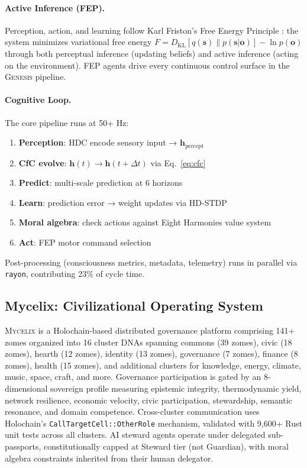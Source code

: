 \documentclass[11pt,letterpaper]{article}
\newcommand{\hv}{\mathbf{h}}
\newcommand{\mycelix}{\textsc{Mycelix}}
\newcommand{\genesis}{\textsc{Genesis}}
\begin{document}
\paragraph{Active Inference (FEP).} Perception, action, and learning follow Karl
Friston's Free Energy Principle \cite{friston2010free,friston2017active}: the
system minimizes variational free energy $F = D_\text{KL}[q(\mathbf{s}) \|
p(\mathbf{s} | \mathbf{o})] - \ln p(\mathbf{o})$ through both perceptual
inference (updating beliefs) and active inference (acting on the environment).
FEP agents drive every continuous control surface in the \genesis{} pipeline.

\paragraph{Cognitive Loop.} The core pipeline runs at 50+ Hz:
\begin{enumerate}[leftmargin=2em,nosep]
\item \textbf{Perception}: HDC encode sensory input → $\hv_\text{percept}$
\item \textbf{CfC evolve}: $\hv(t) \rightarrow \hv(t + \Delta t)$ via Eq.~\ref{eq:cfc}
\item \textbf{Predict}: multi-scale prediction at 6 horizons
\item \textbf{Learn}: prediction error → weight updates via HD-STDP
\item \textbf{Moral algebra}: check actions against Eight Harmonies value system
\item \textbf{Act}: FEP motor command selection
\end{enumerate}
Post-processing (consciousness metrics, metadata, telemetry) runs in parallel
via \texttt{rayon}, contributing 23\% of cycle time.

\subsection{Mycelix: Civilizational Operating System}

\mycelix{} is a Holochain-based distributed governance platform comprising 141+
zomes organized into 16 cluster DNAs spanning commons (39 zomes), civic (18 zomes), hearth (12 zomes), identity (13 zomes), governance (7 zomes), finance (8 zomes), health (15 zomes), and additional clusters for knowledge, energy, climate, music, space, craft, and more. Governance participation is gated by an 8-dimensional sovereign profile measuring epistemic integrity, thermodynamic yield, network resilience, economic velocity, civic participation, stewardship, semantic resonance, and domain competence. Cross-cluster
communication uses Holochain's \texttt{CallTargetCell::OtherRole} mechanism,
validated with 9,600+ Rust unit tests across all clusters. AI steward agents operate under delegated sub-passports, constitutionally capped at Steward tier (not Guardian), with moral algebra constraints inherited from their human delegator.
\end{document}

